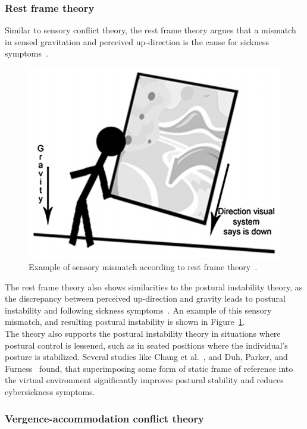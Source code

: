 \subsubsection{Rest frame theory}
Similar to sensory conflict theory, the rest frame theory argues that a mismatch in sensed gravitation and perceived
up-direction is the cause for sickness symptoms~\cite{Rebenitsch2016}.
\begin{figure}[h]
    \centering
    \includegraphics[width=\textwidth/2]{content/2_related_work/img/SensoryMismatchRestFrame[Rebenitsch2016]}
    \caption{Example of sensory mismatch according to rest frame theory~\cite{Rebenitsch2016}.}
    \label{fig:sensory-mismatch-example}
\end{figure}
The rest frame theory also shows similarities to the postural instability theory, as the discrepancy between perceived
up-direction and gravity leads to postural instability and following sickness symptoms~\cite{Rebenitsch2016}.
An example of this sensory mismatch, and resulting postural instability is shown in
Figure~\ref{fig:sensory-mismatch-example}.
\\
The theory also supports the postural instability theory in situations where postural control is lessened, such as in
seated positions where the individual's posture is stabilized.
Several studies like Chang et al.~\cite{Chang2013}, and Duh, Parker, and Furness~\cite{Duh2001b} found, that
superimposing some form of static frame of reference into the virtual environment significantly improves postural
stability and reduces cybersickness symptoms.


\subsubsection{Vergence-accommodation conflict theory}\label{subsubsec:vergence-accommodation-conflict-theory}

